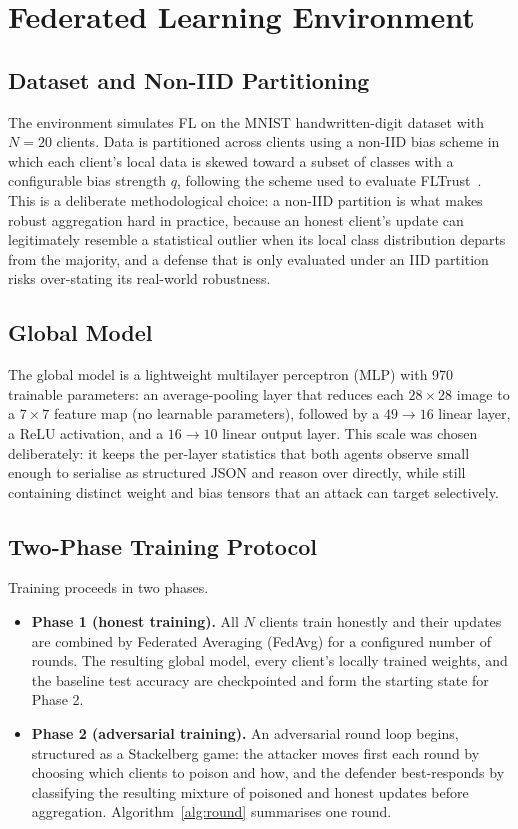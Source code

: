 \section{Federated Learning Environment}
\label{sec:method-environment}

\subsection{Dataset and Non-IID Partitioning}
The environment simulates FL on the MNIST handwritten-digit dataset with $N = 20$ clients. Data is partitioned across clients using a non-IID bias scheme in which each client's local data is skewed toward a subset of classes with a configurable bias strength $q$, following the scheme used to evaluate FLTrust~\citep{fltrust}. This is a deliberate methodological choice: a non-IID partition is what makes robust aggregation hard in practice, because an honest client's update can legitimately resemble a statistical outlier when its local class distribution departs from the majority, and a defense that is only evaluated under an IID partition risks over-stating its real-world robustness.

\subsection{Global Model}
The global model is a lightweight multilayer perceptron (MLP) with 970 trainable parameters: an average-pooling layer that reduces each $28\times28$ image to a $7\times7$ feature map (no learnable parameters), followed by a $49 \rightarrow 16$ linear layer, a ReLU activation, and a $16 \rightarrow 10$ linear output layer. This scale was chosen deliberately: it keeps the per-layer statistics that both agents observe small enough to serialise as structured JSON and reason over directly, while still containing distinct weight and bias tensors that an attack can target selectively.

\subsection{Two-Phase Training Protocol}
Training proceeds in two phases.

\begin{itemize}
    \item \textbf{Phase 1 (honest training).} All $N$ clients train honestly and their updates are combined by Federated Averaging (FedAvg) for a configured number of rounds. The resulting global model, every client's locally trained weights, and the baseline test accuracy are checkpointed and form the starting state for Phase 2.
    \item \textbf{Phase 2 (adversarial training).} An adversarial round loop begins, structured as a Stackelberg game: the attacker moves first each round by choosing which clients to poison and how, and the defender best-responds by classifying the resulting mixture of poisoned and honest updates before aggregation. Algorithm~\ref{alg:round} summarises one round.
\end{itemize}

